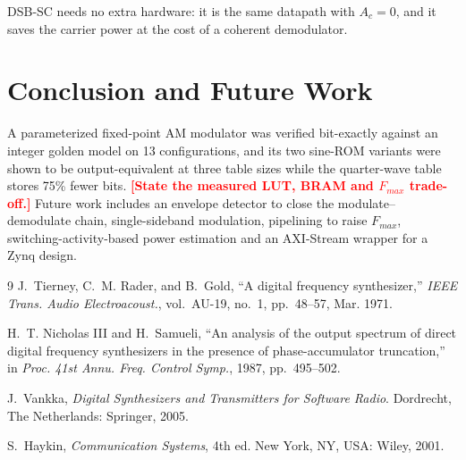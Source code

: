 \documentclass[conference]{IEEEtran}
\newcommand{\todo}[1]{\textcolor{red}{\textbf{[#1]}}}
\begin{document}
DSB-SC needs no extra hardware: it is the same datapath with $A_c=0$, and it
saves the carrier power at the cost of a coherent demodulator.

\section{Conclusion and Future Work}
A parameterized fixed-point AM modulator was verified bit-exactly against an
integer golden model on 13 configurations, and its two sine-ROM variants were
shown to be output-equivalent at three table sizes while the quarter-wave table
stores 75\% fewer bits. \todo{State the measured LUT, BRAM and $F_{max}$ trade-off.}
Future work includes an envelope detector to close the modulate--demodulate
chain, single-sideband modulation, pipelining to raise $F_{max}$,
switching-activity-based power estimation and an AXI-Stream wrapper for a Zynq
design.

\begin{thebibliography}{9}
J.~Tierney, C.~M. Rader, and B.~Gold, ``A digital frequency synthesizer,''
\emph{IEEE Trans. Audio Electroacoust.}, vol.~AU-19, no.~1, pp.~48--57, Mar. 1971.

H.~T. Nicholas III and H.~Samueli, ``An analysis of the output spectrum of direct
digital frequency synthesizers in the presence of phase-accumulator truncation,''
in \emph{Proc. 41st Annu. Freq. Control Symp.}, 1987, pp.~495--502.

J.~Vankka, \emph{Digital Synthesizers and Transmitters for Software Radio}.
Dordrecht, The Netherlands: Springer, 2005.

S.~Haykin, \emph{Communication Systems}, 4th ed. New York, NY, USA: Wiley, 2001.

\end{thebibliography}
\end{document}

